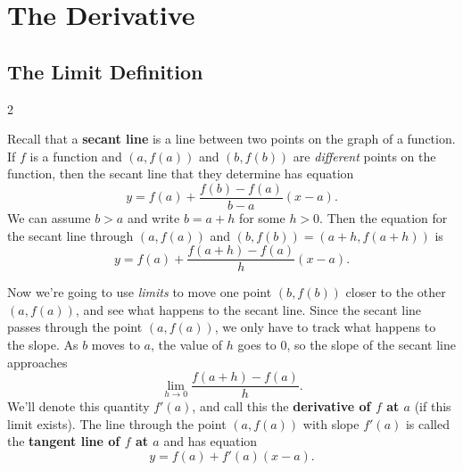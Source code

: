 \section{The Derivative}
\label{sec:the-derivative}

\subsection{The Limit Definition}

\begin{multicols}{2}

Recall that a \textbf{secant line} is a line between two points on the graph of a function. If $f$ is a function and $(a,f(a))$ and $(b,f(b))$ are \textit{different} points on the function, then the secant line that they determine has equation
$$y=f(a) + \frac{f(b)-f(a)}{b-a}(x-a).$$
We can assume $b>a$ and write $b=a+h$ for some $h>0$. Then the equation for the secant line through $(a,f(a))$ and $(b,f(b))=(a+h,f(a+h))$ is
$$y=f(a) + \frac{f(a+h)-f(a)}{h}(x-a).$$


Now we're going to use \textit{limits} to move one point $(b,f(b))$ closer to the other $(a,f(a))$, and see what happens to the secant line. Since the secant line passes through the point $(a,f(a))$, we only have to track what happens to the slope. As $b$ moves to $a$, the value of $h$ goes to $0$, so the slope of the secant line approaches
$$\lim_{h\to 0}\frac{f(a+h)-f(a)}{h}.$$
We'll denote this quantity $f'(a)$, and call this the \textbf{derivative of $f$ at $a$} (if this limit exists). The line through the point $(a,f(a))$ with slope $f'(a)$ is called the \textbf{tangent line of $f$ at $a$} and has equation
$$y=f(a)+f'(a)(x-a).$$

\columnbreak

\end{multicols}
